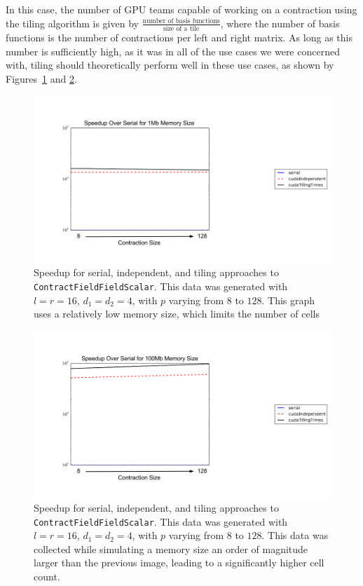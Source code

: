 In this case, the number of GPU teams
capable of working on a contraction using the tiling algorithm is given by
$\frac{\text{number of basis functions}}{\text{size of a tile}}$, where the number of basis functions
is the number of contractions per left and right matrix. As long as this number
is sufficiently high, as it was in all of the use cases we were concerned with, 
tiling should theoretically perform well in these use cases, as shown by
Figures~\ref{fig:multiDTiling1} and \ref{fig:multiDTiling2}.

\begin{figure}[H]
    \centering
    \includegraphics[scale = .4]{CFFTTiling1}
    \caption[\texttt{ContractFieldFieldScalar} tiling (small
    memory)]{Speedup for serial, independent, and tiling approaches to
        \texttt{ContractFieldFieldScalar}.  This data was generated with
        $l=r=16$, $d_1=d_2=4$, with $p$
varying from $8$ to $128$. This graph uses a relatively low memory size, which
limits the number of cells}
\label{fig:multiDTiling1}
\end{figure}

\begin{figure}[H]
    \centering
\includegraphics[scale = .4]{CFFTTiling2}
\caption[\texttt{ContractFieldFieldScalar} tiling (large
memory)]{Speedup for serial, independent, and tiling approaches to
    \texttt{ContractFieldFieldScalar}. This data was generated with
    $l=r=16$, $d_1=d_2=4$, with $p$ varying from $8$ to $128$. This
data was collected while simulating a memory size an order of magnitude larger
than the previous image, leading to a significantly higher cell count. }
\label{fig:multiDTiling2}
\end{figure}

